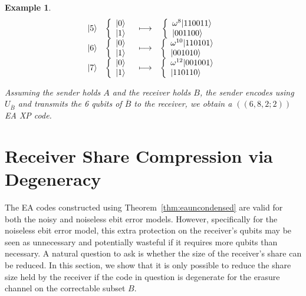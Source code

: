 \documentclass[]{amsart}
\DeclarePairedDelimiter\ket{\lvert}{\rangle}
\newtheorem{example}[theorem]{Example}
\begin{document}
\begin{example}
\[\begin{array}{cccc}
\ket{5} & \left\{ \begin{array}{l}  \ket{0} \\ \ket{1} \end{array} \right. & \longmapsto & \left\{ \begin{array}{l} \omega^8\ket{110011} \\ \ket{001100} \end{array} \right. \\  
\ket{6} & \left\{ \begin{array}{l}  \ket{0} \\ \ket{1} \end{array} \right. & \longmapsto & \left\{ \begin{array}{l} \omega^{10}\ket{110101} \\ \ket{001010} \end{array} \right. \\ 
\ket{7} & \left\{ \begin{array}{l}  \ket{0} \\ \ket{1} \end{array} \right. & \longmapsto & \left\{ \begin{array}{l} \omega^{12}\ket{001001} \\ \ket{110110} \end{array} \right. \\ 
\end{array}
\]

Assuming the sender holds $A$ and the receiver holds $B$, the sender encodes using $U_{\overline{B}}$ and transmits the 6 qubits of $\overline{B}$ to the receiver, we obtain a $(\!(6,8,2;2)\!)$ EA XP code.
\end{example} 

\section{Receiver Share Compression via Degeneracy}\label{sec:reduceentang}

The  EA codes constructed using Theorem~\ref{thm:eauncondensed} are valid for both the noisy and noiseless ebit error models.
However, specifically for the noiseless ebit error model, this extra protection on the receiver's qubits may be seen as unnecessary and potentially wasteful if it requires more qubits than necessary.
A natural question to ask is whether the size of the receiver's share can be reduced.
In this section, we show that it is only possible to reduce the share size held by the receiver if the code in question is degenerate for the erasure channel on the correctable subset $B$.
\end{document}
